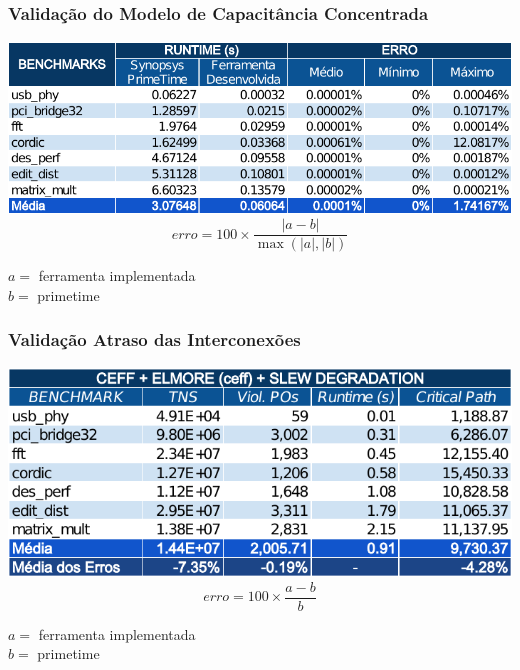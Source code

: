 \documentclass[10pt,a4paper]{beamer}
\begin{document}
		\subsection*{}		
		\begin{frame}
			\frametitle{Validação do Modelo de Capacitância Concentrada}
			\begin{center}
				\includegraphics[width=\linewidth]{img/lumped_capacitance_vs_primetime.pdf} 
				$$erro = 100 \times \frac{|a - b|}{\max(|a|, |b|)} $$
			\end{center}

			$a = $ ferramenta implementada \\
			$b = $ primetime
			
			
		\end{frame}
		
		\begin{frame}
			\frametitle{Validação Atraso das Interconexões}
			\begin{center}
				\includegraphics[width=\linewidth]{img/ceff_elmore_slew.pdf}
				$$erro = 100 \times \frac{a - b}{ b } $$
			\end{center}
			
			$a = $ ferramenta implementada \\
			$b = $ primetime
			
		\end{frame}
		
\end{document}
